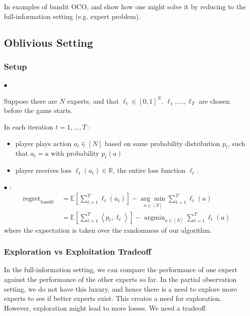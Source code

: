 \documentclass{article}
\begin{document}
\begin{rema}
 In examples of bandit OCO, and show how one might solve it by reducing to the full-information setting (e.g. expert problem). 
\end{rema}

\subsection{Oblivious Setting}
\subsubsection{Setup}
$\bullet$ 

Suppose there are $N$ experts, and that $\ell_{t} \in[0,1]^{N}$.  $\ell_{1}, \ldots, \ell_{T}$ are chosen before the game starts.

In each iteration $t=1, \ldots, T$ :
\begin{itemize}
    \item player plays action $a_{t} \in[N]$ based on some probability distribution $p_{t}$, such that $a_{t}=a$ with probability $p_{t}(a)$
    \item player receives loss $\ell_{t}\left(a_{t}\right) \in \mathbb{R}$,   the entire loss function $\ell_{t}$.
\end{itemize} 

$\bullet$ :
$$
\begin{aligned}
\operatorname{regret}_{\text {bandit }} &=\mathbb{E}\left[\sum_{t=1}^{T} \ell_{t}\left(a_{t}\right)\right]-\underset{a \in[N]}{\arg \min } \sum_{t=1}^{T} \ell_{t}(a) \\
&=\mathbb{E}\left[\sum_{t=1}^{T}\left\langle p_{t}, \ell_{t}\right\rangle\right]-\operatorname{argmin}_{a \in[N]} \sum_{t=1}^{T} \ell_{t}(a)
\end{aligned}
$$
where the expectation is taken over the randomness of our algorithm.
\subsubsection{Exploration vs Exploitation Tradeoff} 
In the full-information setting, we can compare the performance of one expert against the performance of the other experts so far. In the partial observation setting, we do not have this luxury, and hence there is a need to explore more experts to see if better experts exist. This creates a need for exploration.
However, exploration might lead to more losses. We need a tradeoff.
\end{document}
